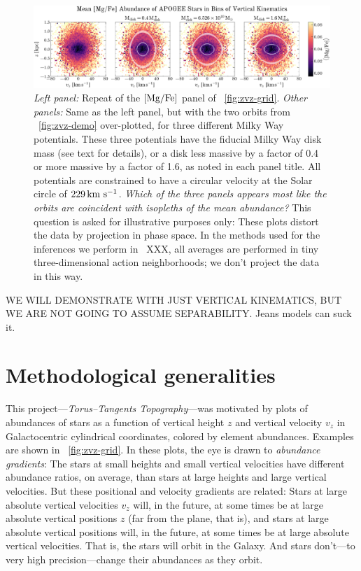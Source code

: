 \documentclass[modern]{aastex63}
\newcommand{\methodname}{\textsl{Torus--Tangents Topography}}
\begin{document}
\begin{figure}[!tp]
  \begin{center}
  \includegraphics[width=\textwidth]{zvz-mean-MG_FE}
  \end{center}
  \caption{%
    \textsl{Left panel:} Repeat of the ${[\mathrm{Mg}/\mathrm{Fe}]}$ panel of \figurename~\ref{fig:zvz-grid}.
    \textsl{Other panels:} Same as the left panel, but with the two orbits
    from \figurename~\ref{fig:zvz-demo}
    over-plotted, for three different Milky Way potentials.
    These three potentials have the fiducial Milky Way disk mass (see text
    for details), or a disk less massive by a factor of 0.4 or more
    massive by a factor of 1.6, as noted in each panel title.
    All potentials are constrained to have a circular velocity at the
    Solar circle of $229\,\mathrm{km}~\mathrm{s}^{-1}$.
    \emph{Which of the three panels appears most like the orbits are
    coincident with isopleths of the mean abundance?}
    This question is asked for illustrative purposes only: These
    plots distort the data by projection in phase space.
    In the methods used for the inferences we perform in
    \sectionname~XXX, all averages are performed in tiny
    three-dimensional action neighborhoods; we don't project the data in this way.
  \label{fig:zvz-mgfe}
  }
\end{figure}

WE WILL DEMONSTRATE WITH JUST VERTICAL KINEMATICS, BUT WE ARE NOT
GOING TO ASSUME SEPARABILITY.  Jeans models can suck it.

\section{Methodological generalities}

This project---\methodname---was motivated by plots of abundances of stars as a
function of vertical height $z$ and vertical velocity $v_z$ in
Galactocentric cylindrical coordinates, colored by element abundances.
Examples are shown in \figurename~\ref{fig:zvz-grid}.
In these plots,
the eye is drawn to \emph{abundance gradients}: The stars at small
heights and small vertical velocities have different abundance ratios,
on average, than stars at large heights and large vertical velocities.
But these positional and velocity gradients are related:
Stars at large absolute vertical velocities $v_z$ will, in the future, at some
times be at large absolute vertical positions $z$ (far from the plane, that is),
and stars at large absolute vertical positions will, in the future,
at some times be at large absolute vertical velocities.
That is, the stars will orbit in the Galaxy.
And stars don't---to very high precision---change their abundances as
they orbit.
\end{document}

